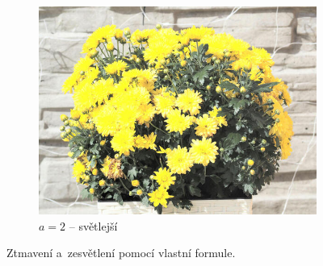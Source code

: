 \documentclass[11pt, a4paper, titlepage]{article}
\begin{document}
\begin{figure}[h]
\begin{subfigure}[t]{0.25\textwidth}
        \vskip 0pt
        \includegraphics[width=1.0\textwidth]{kvetina_mul_up.jpg}
        \caption{$a = 2$ -- světlejší}
    \end{subfigure}
    \caption{Ztmavení a~zesvětlení pomocí vlastní formule.}
    \label{fig:multiplication-luma}
\end{figure}
\end{document}

